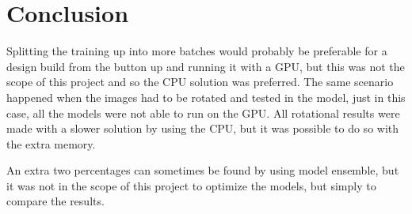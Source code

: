 \chapter{Conclusion}
\label{chp:conc}

Splitting the training up into more batches would probably be preferable for a design build from the button up and running it with a GPU, but this was not the scope of this project and so the CPU solution was preferred. The same scenario happened when the images had to be rotated and tested in the model, just in this case, all the models were not able to run on the GPU. All rotational results were made with a slower solution by using the CPU, but it was possible to do so with the extra memory.


An extra two percentages can sometimes be found by using model ensemble, but it was not in the scope of this project to optimize the models, but simply to compare the results.